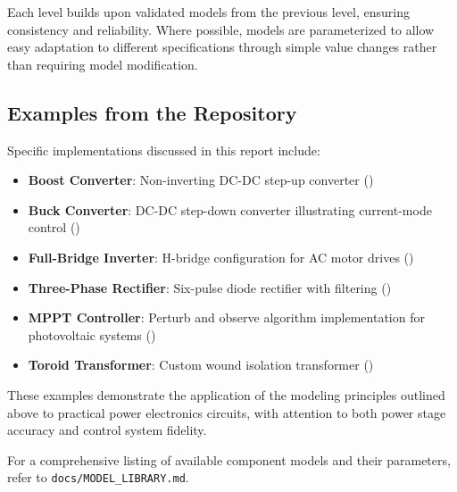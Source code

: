 Each level builds upon validated models from the previous level, ensuring consistency and reliability. Where possible, models are parameterized to allow easy adaptation to different specifications through simple value changes rather than requiring model modification.

\subsection{Examples from the Repository}
Specific implementations discussed in this report include:
\begin{itemize}
    \item \textbf{Boost Converter}: Non-inverting DC-DC step-up converter ()
    \item \textbf{Buck Converter}: DC-DC step-down converter illustrating current-mode control ()
    \item \textbf{Full-Bridge Inverter}: H-bridge configuration for AC motor drives ()
    \item \textbf{Three-Phase Rectifier}: Six-pulse diode rectifier with filtering ()
    \item \textbf{MPPT Controller}: Perturb and observe algorithm implementation for photovoltaic systems ()
    \item \textbf{Toroid Transformer}: Custom wound isolation transformer ()
\end{itemize}

These examples demonstrate the application of the modeling principles outlined above to practical power electronics circuits, with attention to both power stage accuracy and control system fidelity.

For a comprehensive listing of available component models and their parameters, refer to \texttt{docs/MODEL\_LIBRARY.md}.